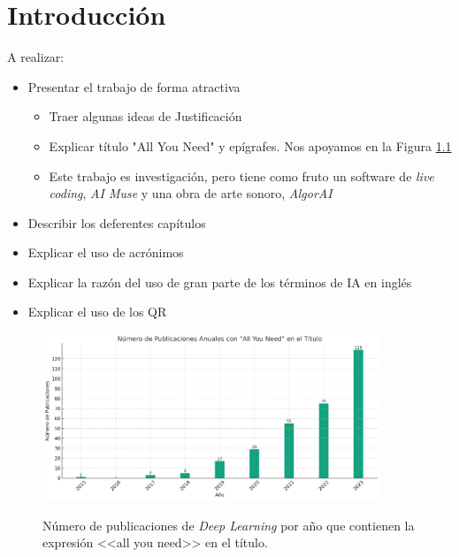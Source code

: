 \chapter{Introducción}


A realizar:
\begin{itemize}
    \item Presentar el trabajo de forma atractiva
    \begin{itemize}
        \item Traer algunas ideas de Justificación
        \item Explicar título "All You Need" y epígrafes. Nos apoyamos en la Figura \ref{fig:all_you_need_publicaciones}
        \item Este trabajo es investigación, pero tiene como fruto un software de \textit{live coding}, \textit{AI Muse} y una obra de arte sonoro, \textit{AlgorAI}
    \end{itemize}
    \item Describir los deferentes capítulos
    \item Explicar el uso de acrónimos
    \item Explicar la razón del uso de gran parte de los términos de IA en inglés
    \item Explicar el uso de los QR
\end{itemize}




\begin{figure}[H]
    \caption[Número de publicaciones de \textit{Deep Learning} por año que contienen la expresión <<all you need>> en el título]{Número de publicaciones de \textit{Deep Learning} por año que contienen la expresión <<all you need>> en el título.}
    \centering
    \includegraphics[width=0.9\textwidth]{./figuras/all_you_need_publicacionies_anuales.png}
    \label{fig:all_you_need_publicaciones}
\end{figure}


